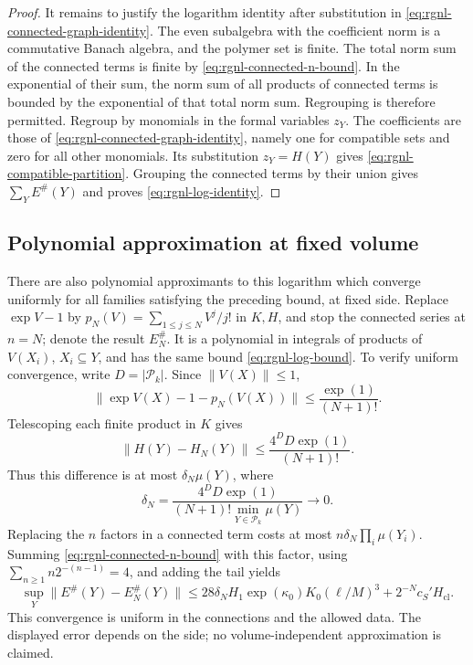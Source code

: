 \begin{proof}
It remains to justify the logarithm identity after
substitution in \eqref{eq:rgnl-connected-graph-identity}.
The even subalgebra with the coefficient norm is a
commutative Banach algebra, and the polymer set is finite.
The total norm sum of the connected terms is finite by
\eqref{eq:rgnl-connected-n-bound}.
In the exponential of their sum, the norm sum of all
products of connected terms is bounded by the exponential
of that total norm sum. Regrouping is therefore permitted.
Regroup by monomials in the formal variables $z_Y$.
The coefficients are those of
\eqref{eq:rgnl-connected-graph-identity}, namely one
for compatible sets and zero for all other monomials.
Its substitution $z_Y=H(Y)$ gives
\eqref{eq:rgnl-compatible-partition}. Grouping the
connected terms by their union gives
$\sum_YE^\#(Y)$ and proves \eqref{eq:rgnl-log-identity}.
\end{proof}

\subsection{Polynomial approximation at fixed volume}\label{subsec:rgnl-polynomial-approximation}

There are also polynomial approximants to this logarithm
which converge uniformly for all families satisfying the
preceding bound, at fixed side. Replace $\exp V-1$ by
$p_N(V)=\sum_{1\le j\le N}V^j/j!$ in $K,H$, and stop
the connected series at $n=N$; denote the result $E_N^\#$.
It is a polynomial in integrals of products of $V(X_i)$,
$X_i\subseteq Y$, and has the same bound
\eqref{eq:rgnl-log-bound}. To verify uniform convergence,
write $D=|\mathcal P_k|$. Since $\|V(X)\|\le1$,
\[
 \|\exp V(X)-1-p_N(V(X))\|
                                  \le\frac{\exp(1)}{(N+1)!}.
\]
Telescoping each finite product in $K$ gives
\[
 \|H(Y)-H_N(Y)\|\le
                             \frac{4^DD\exp(1)}{(N+1)!}.
\]
Thus this difference is at most $\delta_N\mu(Y)$, where
\[
 \delta_N=\frac{4^DD\exp(1)}
                      {(N+1)!\min_{Y\in\mathcal P_k}\mu(Y)}
                                                   \longrightarrow0.
\]
Replacing the $n$ factors in a connected term costs at
most $n\delta_N\prod_i\mu(Y_i)$. Summing
\eqref{eq:rgnl-connected-n-bound} with this factor, using
$\sum_{n\ge1}n2^{-(n-1)}=4$, and adding the tail yields
\[
 \sup_Y\|E^\#(Y)-E_N^\#(Y)\|
 \le28\delta_NH_1\exp(\kappa_0)K_0(\ell/M)^3
                                  +2^{-N}c_S'H_{\mathrm{cl}}.
\]
This convergence is uniform in the connections and the
allowed data. The displayed error depends on the side;
no volume-independent approximation is claimed.

